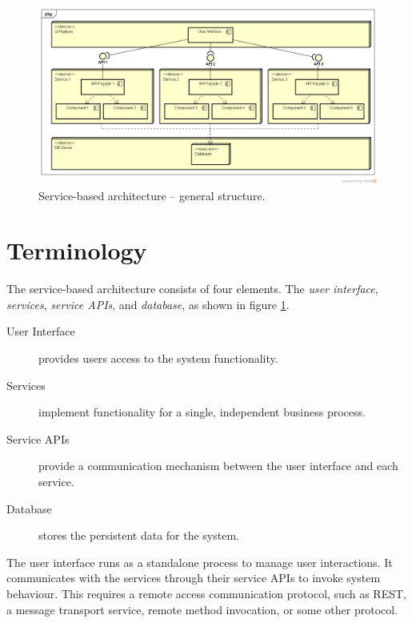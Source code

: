\begin{figure}[h!]
    \begin{adjustwidth}{-7.5mm}{-7.5mm}
        \centering
        \includegraphics[trim=39 43 19 44,clip,width=0.95\paperwidth]{diagrams/general-service-based-arch.png}
    \end{adjustwidth}
    \caption{Service-based architecture -- general structure.}
    \label{fig:service-based-arch}
\end{figure}


\section{Terminology}

The service-based architecture consists of four elements.
The \emph{user interface}, \emph{services}, \emph{service APIs}, and \emph{database}, as shown in figure \ref{fig:service-based-arch}.

\begin{description}
    \item[User Interface] provides users access to the system functionality.
    \item[Services] implement functionality for a single, independent business process.
    \item[Service APIs] provide a communication mechanism between the user interface and each service.
    \item[Database] stores the persistent data for the system.
\end{description}

The user interface runs as a standalone process to manage user interactions.
It communicates with the services through their service APIs to invoke system behaviour.
This requires a remote access communication protocol, such as REST, a message transport service,
remote method invocation,  or some other protocol.

